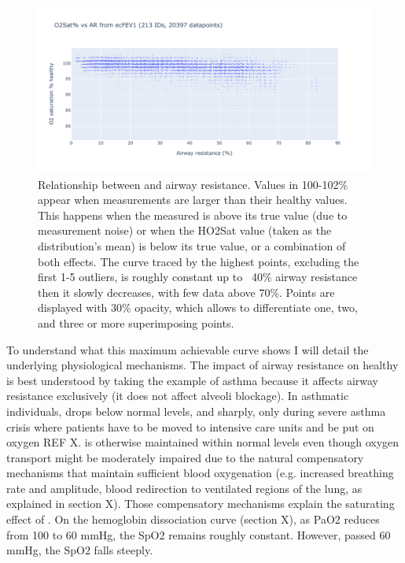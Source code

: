 \begin{figure}[!h]
    \centering
    \includegraphics[width=140mm]{Chapter1/Figs/o2sath_ar.pdf}
    \caption{Relationship between \OXSatPrct and airway resistance. Values in 100-102\% appear when \OXSat measurements are larger than their healthy values. This happens when the measured \OXSat is above its true value (due to measurement noise) or when the HO2Sat value (taken as the distribution's mean) is below its true value, or a combination of both effects. The curve traced by the highest points, excluding the first 1-5 outliers, is roughly constant up to ~40\% airway resistance then it slowly decreases, with few data above 70\%. Points are displayed with 30\% opacity, which allows to differentiate one, two, and three or more superimposing points. }
    \label{fig:o2sath_ar}
\end{figure}


To understand what this maximum achievable \OXSatPrct curve shows I will detail the underlying physiological mechanisms. The impact of airway resistance on healthy \OXSat is best understood by taking the example of asthma because it affects airway resistance exclusively (it does not affect alveoli blockage). In asthmatic individuals, \OXSat drops below normal levels, and sharply, only during severe asthma crisis where patients have to be moved to intensive care units and be put on oxygen REF X. \OXSat is otherwise maintained within normal levels even though oxygen transport might be moderately impaired due to the natural compensatory mechanisms that maintain sufficient blood oxygenation (e.g. increased breathing rate and amplitude, blood redirection to ventilated regions of the lung, as explained in section X). Those compensatory mechanisms explain the saturating effect of \OXSat. On the hemoglobin dissociation curve (section X), as PaO2 reduces from 100 to 60 mmHg, the SpO2 remains roughly constant. However, passed 60 mmHg, the SpO2 falls steeply.

